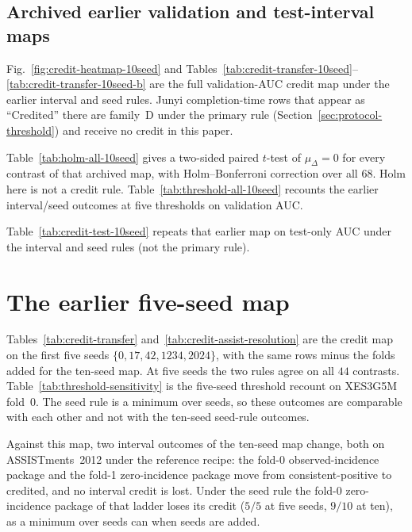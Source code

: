 \documentclass[review,12pt]{elsarticle}
\begin{document}



\FloatBarrier

\subsection{Archived earlier validation and test-interval maps}
Fig.~\ref{fig:credit-heatmap-10seed} and
Tables~\ref{tab:credit-transfer-10seed}--\ref{tab:credit-transfer-10seed-b}
are the full validation-AUC credit map under the earlier interval and
seed rules. Junyi completion-time rows that appear as ``Credited'' there
are family~D under the primary rule
(Section~\ref{sec:protocol-threshold}) and receive no credit in this
paper.



\FloatBarrier

Table~\ref{tab:holm-all-10seed} gives a two-sided paired $t$-test of
$\mu_\Delta{=}0$ for every contrast of that archived map, with
Holm--Bonferroni correction over all $68$. Holm here is not a credit
rule. Table~\ref{tab:threshold-all-10seed} recounts the earlier
interval/seed outcomes at five thresholds on validation AUC.



\FloatBarrier

Table~\ref{tab:credit-test-10seed} repeats that earlier map on
test-only AUC under the interval and seed rules (not the primary rule).


\FloatBarrier

\section{The earlier five-seed map}
\label{app:five-seed}
Tables~\ref{tab:credit-transfer} and~\ref{tab:credit-assist-resolution}
are the credit map on the first five seeds $\{0,17,42,1234,2024\}$,
with the same rows minus the folds added for the ten-seed map. At five
seeds the two rules agree on all $44$ contrasts.
Table~\ref{tab:threshold-sensitivity} is the five-seed threshold recount
on XES3G5M fold~0. The seed rule is a minimum over seeds, so these
outcomes are comparable with each other and not with the ten-seed
seed-rule outcomes.

Against this map, two interval outcomes of the ten-seed map change,
both on ASSISTments~2012 under the reference recipe: the fold-0
observed-incidence package and the fold-1 zero-incidence package move
from consistent-positive to credited, and no interval credit is lost.
Under the seed rule the fold-0 zero-incidence package of that ladder
loses its credit ($5/5$ at five seeds, $9/10$ at ten), as a minimum
over seeds can when seeds are added.
\end{document}
